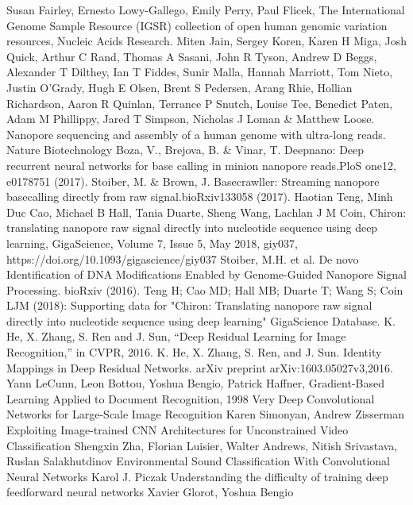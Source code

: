\documentclass[a4paper,11pt,twoside]{report}
\theoremstyle{definition}
\begin{document}
\begin{thebibliography}{20}
 Susan Fairley, Ernesto Lowy-Gallego, Emily Perry, Paul Flicek, The International Genome Sample Resource (IGSR) collection of open human genomic variation resources, Nucleic Acids Research.
 Miten Jain, Sergey Koren, Karen H Miga, Josh Quick, Arthur C Rand, Thomas A Sasani, John R Tyson, Andrew D Beggs, Alexander T Dilthey, Ian T Fiddes, Sunir Malla, Hannah Marriott, Tom Nieto, Justin O'Grady, Hugh E Olsen, Brent S Pedersen, Arang Rhie, Hollian Richardson, Aaron R Quinlan, Terrance P Snutch, Louise Tee, Benedict Paten, Adam M Phillippy, Jared T Simpson, Nicholas J Loman \& Matthew Loose. Nanopore sequencing and assembly of a human genome with ultra-long reads. Nature Biotechnology
Boza, V., Brejova, B. \& Vinar, T. Deepnano: Deep recurrent neural networks for base calling in minion nanopore reads.PloS one12, e0178751 (2017).
Stoiber, M. \& Brown, J. Basecrawller: Streaming nanopore basecalling directly from raw signal.bioRxiv133058 (2017).
 Haotian Teng, Minh Duc Cao, Michael B Hall, Tania Duarte, Sheng Wang, Lachlan J M Coin, Chiron: translating nanopore raw signal directly into nucleotide sequence using deep learning, GigaScience, Volume 7, Issue 5, May 2018, giy037, https://doi.org/10.1093/gigascience/giy037
Stoiber, M.H. et al. De novo Identification of DNA Modifications Enabled by Genome-Guided Nanopore Signal Processing. bioRxiv (2016).
 Teng H; Cao MD; Hall MB; Duarte T; Wang S; Coin LJM (2018): Supporting data for "Chiron: Translating nanopore raw signal directly into nucleotide sequence using deep learning" GigaScience Database.
 K. He, X. Zhang, S. Ren and J. Sun, “Deep Residual Learning for Image Recognition,” in CVPR, 2016.
K. He, X. Zhang, S. Ren, and J. Sun. Identity Mappings in Deep Residual Networks. arXiv preprint arXiv:1603.05027v3,2016.
Yann LeCunn, Leon Bottou, Yoshua Bengio, Patrick Haffner, Gradient-Based Learning Applied to Document Recognition, 1998
Very Deep Convolutional Networks for Large-Scale Image Recognition Karen Simonyan, Andrew Zisserman
 Exploiting Image-trained CNN Architectures for Unconstrained Video Classification Shengxin Zha, Florian Luisier, Walter Andrews, Nitish Srivastava, Ruslan Salakhutdinov
 Environmental Sound Classification With Convolutional Neural Networks Karol J. Piczak
Understanding the difficulty of training deep feedforward neural networks Xavier Glorot, Yoshua Bengio

\end{thebibliography}
\end{document}
